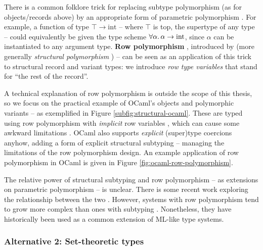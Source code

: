 There is a common folklore trick for replacing subtype polymorphism (as for objects/records above) by an appropriate form of parametric polymorphism \cite{structural-subtyping-as-parameric-polymorphism}. For example, a function of type $\top \to \mathrm{int}$ -- where $\top$ is top, the supertype of any type -- could equivalently be given the type scheme $\forall \alpha \ldotp \alpha \to \mathrm{int}$, since $\alpha$ can be instantiated to any argument type.
\textbf{Row polymorphism} \cite{remy-records}, introduced by \textcite{wand-rows} (more generally \emph{structural polymorphism} \cite{simple-structural-polymorphism}) -- can be seen as an application of this trick to structural record and variant types: we introduce \emph{row type variables} that stand for \enquote{the rest of the record}.

A technical explanation of row polymorphism is outside the scope of this thesis, so we focus on the practical example of OCaml's objects \cite{objective-ml} and polymorphic variants \cite{polymorphic-variants} -- as exemplified in Figure \ref{subfig:structural-ocaml}. These are typed using row polymorphism with \emph{implicit} row variables \cite{objective-ml}, which can cause some awkward limitations \cite{castagna-polymorphic-variants}. OCaml also supports \emph{explicit} (super)type coercions anyhow, adding a form of explicit structural subtyping -- managing the limitations of the row polymorphism design. 
An example application of row polymorphism in OCaml is given in Figure \ref{fig:ocaml-row-polymorphism}.

The relative power of structural subtyping and row polymorphism -- as extensions on parametric polymorphism -- is unclear.
There is some recent work exploring the relationship between the two \cite{disjoint-polymorphism, structural-subtyping-as-parameric-polymorphism}. However, systems with row polymorphism tend to grow more complex than ones with subtyping \cite{castagna-polymorphic-variants}. Nonetheless, they have historically been used as a common extension of ML-like type systems.

\subsubsection{Alternative 2: Set-theoretic types}

